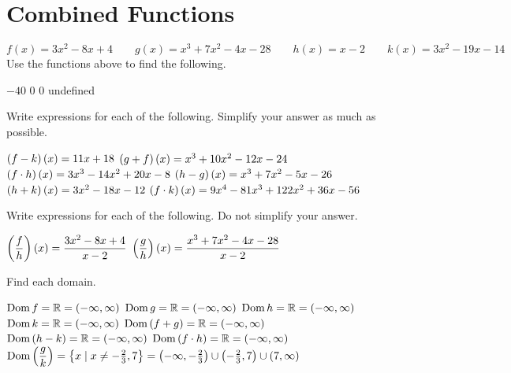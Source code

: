 \section*{Combined Functions}
\[
f(x)=3x^2-8x+4
\qquad
g(x)=x^3+7x^2-4x-28
\qquad
h(x)=x-2
\qquad
k(x)=3x^2-19x-14
\]
Use the functions above to find the following.
\begin{smenum}
\mitemxxxx
{$-40$}
{$0$}
{$0$}
{undefined}
\end{smenum}
Write expressions for each of the following. Simplify your answer as much as possible.
\begin{smenum}
\mitemxx
{$\left(f-k\right)(x)=11x+18$}
{$\left(g+f\right)(x)=x^3+10x^2-12x-24$}
\mitemxx
{$\left(f\cdot h\right)(x)=3x^3-14x^2+20x-8$}
{$\left(h-g\right)(x)=x^3+7x^2-5x-26$}
\mitemxx
{$\left(h+k\right)(x)=3x^2-18x-12$}
{$\left(f\cdot k\right)(x)=9x^4-81x^3+122x^2+36x-56$}
\end{smenum}
Write expressions for each of the following. Do not simplify your answer.
\begin{smenum}
\mitemxx
{$\left(\dfrac{f}{h}\right)(x)=\dfrac{3x^2-8x+4}{x-2}$}
{$\left(\dfrac{g}{h}\right)(x)=\dfrac{x^3+7x^2-4x-28}{x-2}$}
\end{smenum}
Find each domain.
\begin{smenum}
\mitemxx
{$\operatorname{Dom} f=\mathbb{R}=\left(-\infty,\infty\right)$}
{$\operatorname{Dom} g=\mathbb{R}=\left(-\infty,\infty\right)$}
\mitemxx
{$\operatorname{Dom} h=\mathbb{R}=\left(-\infty,\infty\right)$}
{$\operatorname{Dom} k=\mathbb{R}=\left(-\infty,\infty\right)$}
\mitemxx
{$\operatorname{Dom}\left(f+g\right)=\mathbb{R}=\left(-\infty,\infty\right)$}
{$\operatorname{Dom}\left(h-k\right)=\mathbb{R}=\left(-\infty,\infty\right)$}
\mitemx
{$\operatorname{Dom}\left(f\cdot h\right)=\mathbb{R}=\left(-\infty,\infty\right)$}
\mitemx
{$\operatorname{Dom}\left(\dfrac{g}{k}\right)=\left\{x\mid x\neq -\frac{2}{3},7\right\}=\left(-\infty,-\frac{2}{3}\right)\cup\left(-\frac{2}{3},7\right)\cup\left(7,\infty\right)$}
\end{smenum}


